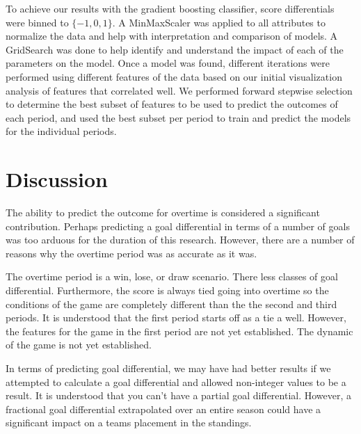 \documentclass[twocolumn,letterpaper,12pt,notitlepage]{article}
\begin{document}
To achieve our results with the gradient boosting classifier, score differentials were binned to $\{-1,0,1\}$. A MinMaxScaler was applied to all attributes to normalize the data and help with interpretation and comparison of models.  A GridSearch was done to help identify and understand the impact of each of the parameters on the model. Once a model was found, different iterations were performed using different features of the data based on our initial visualization analysis of features that correlated well. We performed forward stepwise selection to determine the best subset of features to be used to predict the outcomes of each period, and used the best subset per period to train and predict the models for the individual periods.

\section{Discussion}
The ability to predict the outcome for overtime is considered a significant contribution. Perhaps predicting a goal differential in terms of a number of goals was too arduous for the duration of this research. However, there are a number of reasons why the overtime period was as accurate as it was. 

The overtime period is a win, lose, or draw scenario. There less classes of goal differential. Furthermore, the score is always tied going into overtime so the conditions of the game are completely different than the the second and third periods. It is understood that the first period starts off as a tie a well. However, the features for the game in the first period are not yet established. The dynamic of the game is not yet established. 

In terms of predicting goal differential, we may have had better results if we attempted to calculate a goal differential and allowed non-integer values to be a result.  It is understood that you can't have a partial goal differential. However, a fractional goal differential extrapolated over an entire season could have a significant impact on a teams placement in the standings.
\end{document}
